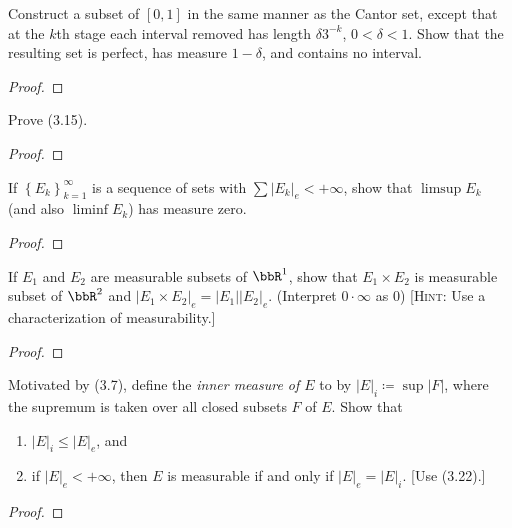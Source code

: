 \begin{problem}
Construct a subset of $[0,1]$ in the same manner as the Cantor set, except
that at the $k$th stage each interval removed has length $\delta 3^{-k}$,
$0<\delta<1$. Show that the resulting set is perfect, has measure
$1-\delta$, and contains no interval.
\end{problem}
\begin{proof}
\end{proof}
\newpage

\begin{problem}
Prove (3.15).
\end{problem}
\begin{proof}
\end{proof}
\newpage

\begin{problem}
If $\left\{E_k\right\}_{k=1}^\infty$ is a sequence of sets with
$\sum\left|E_k\right|_e<+\infty$, show that $\limsup E_k$ (and
also $\liminf E_k$) has measure zero.
\end{problem}
\begin{proof}
\end{proof}
\newpage

\begin{problem}
If $E_1$ and $E_2$ are measurable subsets of $\bbR^1$, show that $E_1\times
E_2$ is measurable subset of $\bbR^2$ and $\left|E_1\times
  E_2\right|_e=\left|E_1\right|\left|E_2\right|_e$. (Interpret
$0\cdot\infty$ as $0$) [\textsc{Hint:} Use a characterization of
measurability.]
\end{problem}
\begin{proof}
\end{proof}
\newpage

\begin{problem}
Motivated by (3.7), define the \emph{inner measure of $E$} to by
$\left|E\right|_i\coloneqq\sup\left|F\right|$, where the supremum is taken
over all closed subsets $F$ of $E$. Show that
\begin{enumerate}[label=(\roman*)]
\item $\left|E\right|_i\leq\left|E\right|_e$, and
\item if $\left|E\right|_e<+\infty$, then $E$ is measurable if and only if
  $\left|E\right|_e=\left|E\right|_i$. [Use (3.22).]
\end{enumerate}

\end{problem}
\begin{proof}
\end{proof}
\newpage

